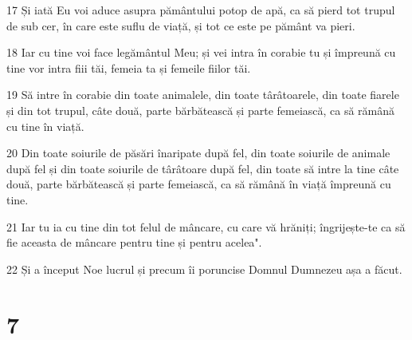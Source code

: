 \par 17 Și iată Eu voi aduce asupra pământului potop de apă, ca să pierd tot trupul de sub cer, în care este suflu de viață, și tot ce este pe pământ va pieri.
\par 18 Iar cu tine voi face legământul Meu; și vei intra în corabie tu și împreună cu tine vor intra fiii tăi, femeia ta și femeile fiilor tăi.
\par 19 Să intre în corabie din toate animalele, din toate târâtoarele, din toate fiarele și din tot trupul, câte două, parte bărbătească și parte femeiască, ca să rămână cu tine în viață.
\par 20 Din toate soiurile de păsări înaripate după fel, din toate soiurile de animale după fel și din toate soiurile de târâtoare după fel, din toate să intre la tine câte două, parte bărbătească și parte femeiască, ca să rămână în viață împreună cu tine.
\par 21 Iar tu ia cu tine din tot felul de mâncare, cu care vă hrăniți; îngrijește-te ca să fie aceasta de mâncare pentru tine și pentru acelea".
\par 22 Și a început Noe lucrul și precum îi poruncise Domnul Dumnezeu așa a făcut.

\chapter{7}

